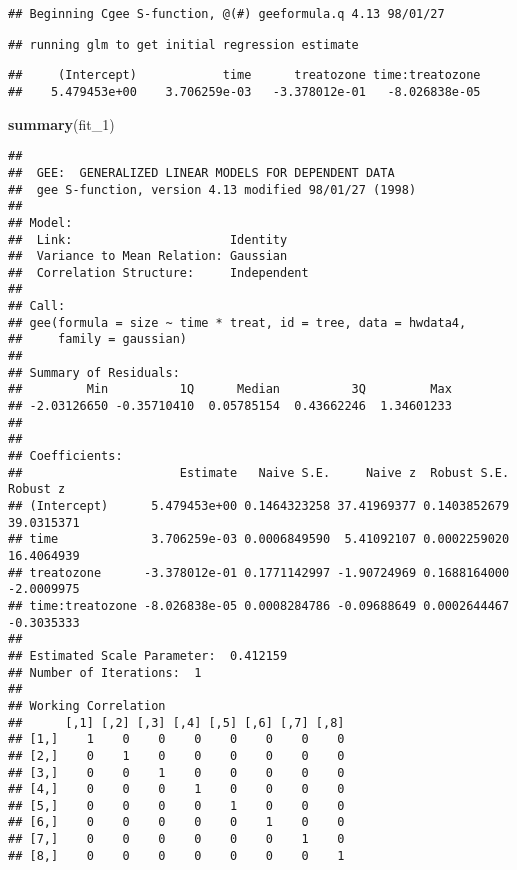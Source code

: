 \documentclass[
]{article}
\newenvironment{Shaded}{\begin{snugshade}}{\end{snugshade}}
\newcommand{\FunctionTok}[1]{\textcolor[rgb]{0.13,0.29,0.53}{\textbf{#1}}}
\newcommand{\NormalTok}[1]{#1}
\begin{document}
\begin{verbatim}
## Beginning Cgee S-function, @(#) geeformula.q 4.13 98/01/27
\end{verbatim}

\begin{verbatim}
## running glm to get initial regression estimate
\end{verbatim}

\begin{verbatim}
##     (Intercept)            time      treatozone time:treatozone 
##    5.479453e+00    3.706259e-03   -3.378012e-01   -8.026838e-05
\end{verbatim}

\begin{Shaded}
\begin{Highlighting}[]
\FunctionTok{summary}\NormalTok{(fit\_1)}
\end{Highlighting}
\end{Shaded}

\begin{verbatim}
## 
##  GEE:  GENERALIZED LINEAR MODELS FOR DEPENDENT DATA
##  gee S-function, version 4.13 modified 98/01/27 (1998) 
## 
## Model:
##  Link:                      Identity 
##  Variance to Mean Relation: Gaussian 
##  Correlation Structure:     Independent 
## 
## Call:
## gee(formula = size ~ time * treat, id = tree, data = hwdata4, 
##     family = gaussian)
## 
## Summary of Residuals:
##         Min          1Q      Median          3Q         Max 
## -2.03126650 -0.35710410  0.05785154  0.43662246  1.34601233 
## 
## 
## Coefficients:
##                      Estimate   Naive S.E.     Naive z  Robust S.E.   Robust z
## (Intercept)      5.479453e+00 0.1464323258 37.41969377 0.1403852679 39.0315371
## time             3.706259e-03 0.0006849590  5.41092107 0.0002259020 16.4064939
## treatozone      -3.378012e-01 0.1771142997 -1.90724969 0.1688164000 -2.0009975
## time:treatozone -8.026838e-05 0.0008284786 -0.09688649 0.0002644467 -0.3035333
## 
## Estimated Scale Parameter:  0.412159
## Number of Iterations:  1
## 
## Working Correlation
##      [,1] [,2] [,3] [,4] [,5] [,6] [,7] [,8]
## [1,]    1    0    0    0    0    0    0    0
## [2,]    0    1    0    0    0    0    0    0
## [3,]    0    0    1    0    0    0    0    0
## [4,]    0    0    0    1    0    0    0    0
## [5,]    0    0    0    0    1    0    0    0
## [6,]    0    0    0    0    0    1    0    0
## [7,]    0    0    0    0    0    0    1    0
## [8,]    0    0    0    0    0    0    0    1
\end{verbatim}
\end{document}
